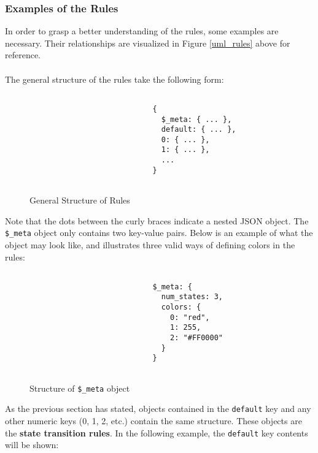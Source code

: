 \subsubsection{Examples of the Rules}
In order to grasp a better understanding of the rules, some examples are necessary. Their relationships are visualized in Figure \ref{uml_rules} above for reference. 
\\ \\
The general structure of the rules take the following form:
\\
\begin{center}
\begin{figure}[H]
\begin{verbatim}

                            {
                              $_meta: { ... },
                              default: { ... },      
                              0: { ... },
                              1: { ... },
                              ...
                            }
    
\end{verbatim}
\caption{General Structure of Rules}
\end{figure}
\end{center}
Note that the dots between the curly braces indicate a nested JSON object. The \texttt{\$\_meta} object only contains two key-value pairs. Below is an example of what the object may look like, and illustrates three valid ways of defining colors in the rules:
\begin{center}
\begin{figure}[H]
\begin{verbatim}
        
                            $_meta: {
                              num_states: 3,
                              colors: {
                                0: "red",
                                1: 255,
                                2: "#FF0000"
                              }
                            }
                
\end{verbatim}
\caption{Structure of \texttt{\$\_meta} object}
\end{figure}
\end{center}
As the previous section has stated, objects contained in the \texttt{default} key and any other numeric keys (0, 1, 2, etc.) contain the same structure. These objects are the \textbf{state transition rules}. In the following example, the \texttt{default} key contents will be shown:
